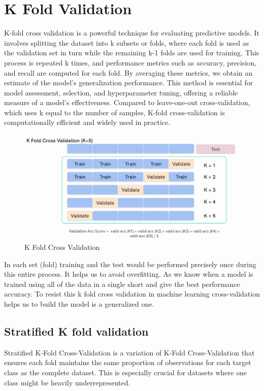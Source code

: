 \section{K Fold Validation}
K-fold cross validation is a powerful technique for evaluating predictive models. It involves splitting the dataset into k subsets or folds, where each fold is used as the validation set in turn while the remaining k-1 folds are used for training. This process is repeated k times, and performance metrics such as accuracy, precision, and recall are computed for each fold. By averaging these metrics, we obtain an estimate of the model’s generalization performance. This method is essential for model assessment, selection, and hyperparameter tuning, offering a reliable measure of a model’s effectiveness. Compared to leave-one-out cross-validation, which uses k equal to the number of samples, K-fold cross-validation is computationally efficient and widely used in practice\cite{esl}\cite{kfold-1}.\par \vspace{1em}
\begin{figure}
    \centering
    \includegraphics[width=1\linewidth]{graphics//chapter3/k fold.png}
    \caption{K Fold Cross Validation}
    \label{fig:k-fold}
\end{figure}

In each set (fold) training and the test would be performed precisely once during this entire process. It helps us to avoid overfitting. As we know when a model is trained using all of the data in a single short and give the best performance accuracy. To resist this k fold cross validation in machine learning cross-validation helps us to build the model is a generalized one.

    \subsection{Stratified K fold validation}
    Stratified K-Fold Cross-Validation is a variation of K-Fold Cross-Validation that ensures each fold maintains the same proportion of observations for each target class as the complete dataset. This is especially crucial for datasets where one class might be heavily underrepresented.

